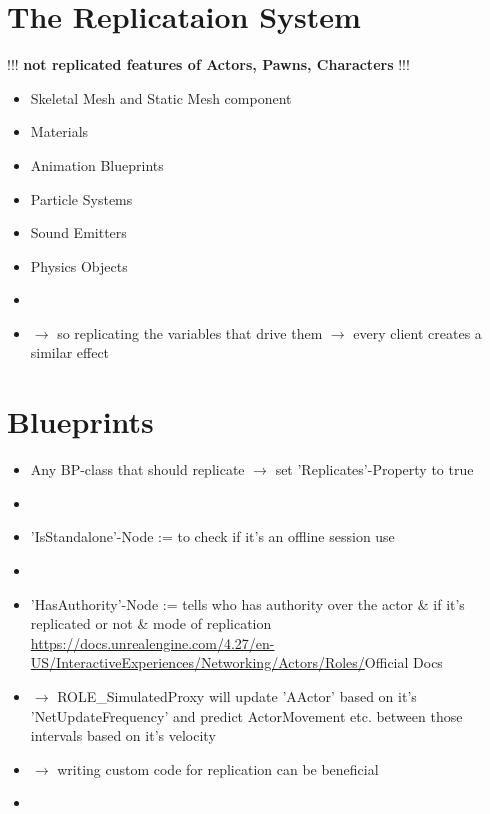     \section{The Replicataion System}

        !!! \textbf{not replicated features of Actors, Pawns, Characters} !!!
        \begin{itemize}
            \item Skeletal Mesh and Static Mesh component
            \item Materials
            \item Animation Blueprints
            \item Particle Systems
            \item Sound Emitters
            \item Physics Objects
            \item 
            \item $\rightarrow$ so replicating the variables that drive them $\rightarrow$ every client creates a similar effect
        \end{itemize}



    \section{Blueprints}
        \begin{itemize}
            \item Any BP-class that should replicate $\rightarrow$ set 'Replicates'-Property to true
            \item 
            \item 'IsStandalone'-Node := to check if it's an offline session use 
            \item 
            \item 'HasAuthority'-Node := tells who has authority over the actor \& if it's replicated or not \& mode of replication \url{https://docs.unrealengine.com/4.27/en-US/InteractiveExperiences/Networking/Actors/Roles/}{Official Docs}
            \item $\rightarrow$ ROLE\_SimulatedProxy will update 'AActor' based on it's 'NetUpdateFrequency' and predict ActorMovement etc. between those intervals based on it's velocity
            \item $\rightarrow$ writing custom code for replication can be beneficial
            \item 
        \end{itemize}


